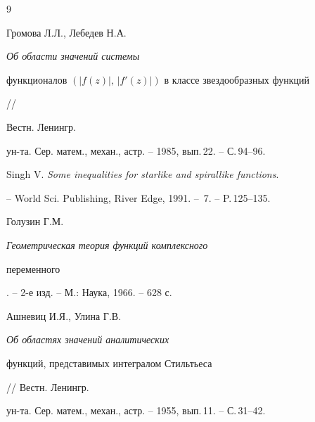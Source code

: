\begin{thebibliography}{9} 


 




Громова Л.Л., Лебедев Н.А. {\em Об области значений системы 


функционалов $(|f(z)|,\,|f'(z)|)$ в классе звездообразных функций} // 


Вестн. Ленингр. 


ун-та. Сер. матем., механ., астр. -- 1985, вып.\,22. -- С.\,94--96. 




Singh V. {\em Some inequalities for starlike and spirallike functions}. 


-- World Sci. Publishing, River Edge, 1991. -- \No\,7. -- P.\,125--135. 




Голузин Г.М. {\em Геометрическая теория функций комплексного 


переменного}. -- 2-е изд. -- М.: Наука, 1966. -- 628 с. 




Ашневиц И.Я., Улина Г.В. {\em Об областях значений аналитических 


функций, представимых интегралом Стильтьеса} // Вестн. Ленингр. 


ун-та. Сер. матем., механ., астр. -- 1955, вып.\,11. -- С.\,31--42.


 


 


\end{thebibliography} 


 


\vskip 2cm 


 






 


\label{end} 


 


